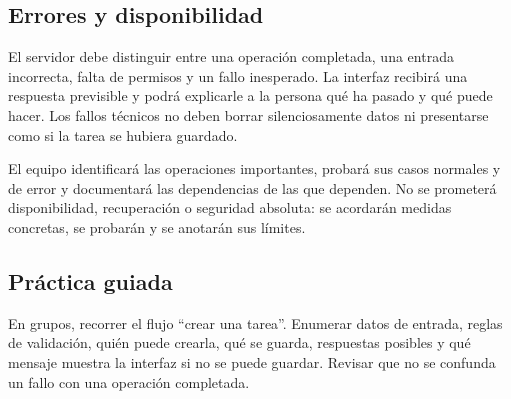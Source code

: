 \subsection{Errores y disponibilidad}
El servidor debe distinguir entre una operación completada, una entrada incorrecta, falta de permisos y un fallo inesperado. La interfaz recibirá una respuesta previsible y podrá explicarle a la persona qué ha pasado y qué puede hacer. Los fallos técnicos no deben borrar silenciosamente datos ni presentarse como si la tarea se hubiera guardado.

El equipo identificará las operaciones importantes, probará sus casos normales y de error y documentará las dependencias de las que dependen. No se prometerá disponibilidad, recuperación o seguridad absoluta: se acordarán medidas concretas, se probarán y se anotarán sus límites.

\subsection{Práctica guiada}
En grupos, recorrer el flujo ``crear una tarea''. Enumerar datos de entrada, reglas de validación, quién puede crearla, qué se guarda, respuestas posibles y qué mensaje muestra la interfaz si no se puede guardar. Revisar que no se confunda un fallo con una operación completada.

